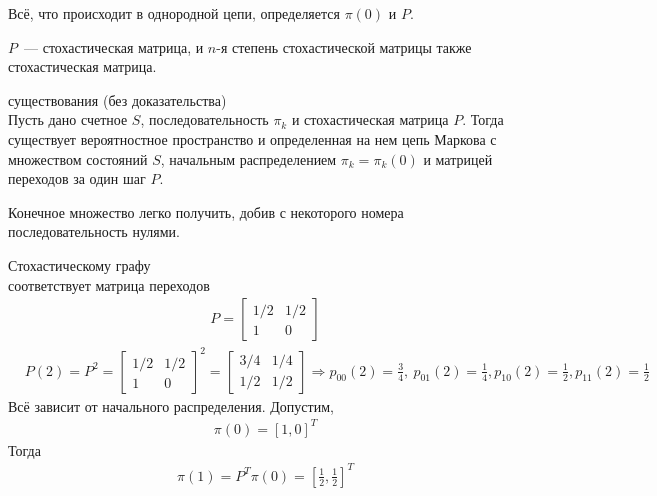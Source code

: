 Всё, что происходит в однородной цепи, определяется $\pi(0)$ и $P$.
\begin{Note}
    $P$~--- стохастическая матрица, и $n$-я степень стохастической матрицы также
    стохастическая матрица.
\end{Note}
\begin{theorem} существования (без доказательства)
    \\
    Пусть дано счетное $S$, последовательность $\pi_k$ и стохастическая матрица
    $P$. Тогда существует вероятностное пространство и определенная на нем цепь
    Маркова с множеством состояний $S$, начальным распределением $\pi_k =
    \pi_k(0)$ и матрицей переходов за один шаг $P$.
\end{theorem}
\begin{Note}
    Конечное множество легко получить, добив с некоторого номера
    последовательность нулями.
\end{Note}
\begin{example}
    Стохастическому графу
    \\
    соответствует матрица переходов
    \begin{align*}
      & P = \left[ \begin{matrix}
              1/2 & 1/2 \\
              1 & 0
          \end{matrix} \right]
    \end{align*}
    \begin{align*}
      & P(2) = P^2 = \left[ \begin{matrix}
              1/2 & 1/2 \\
              1 & 0
          \end{matrix} \right]^2 = \left[ \begin{matrix}
              3/4 & 1/4 \\
              1/2 & 1/2
          \end{matrix} \right] \Rightarrow p_{00}(2) = \frac{3}{4}, \ p_{01}(2) = \frac{1}{4}, p_{10}(2) = \frac{1}{2}, p_{11}(2) = \frac{1}{2}
    \end{align*}
    Всё зависит от начального распределения. Допустим,
    \begin{align*}
      & \pi(0) = \left[ 1,0 \right]^T
    \end{align*}
    Тогда
    \begin{align*}
      & \pi(1) = P^T\pi(0) = \left[ \frac{1}{2},\frac{1}{2} \right]^T
    \end{align*}  
\end{example}
